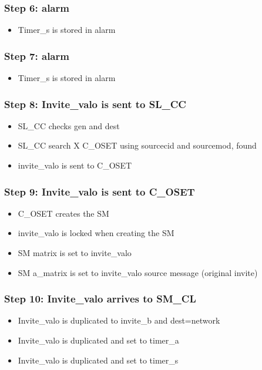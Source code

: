 \documentclass[a4paper]{report}
\begin{document}
\subsubsection{Step 6: alarm} 
\begin{itemize}
   \item Timer\_s is stored in alarm
\end{itemize}

\subsubsection{Step 7: alarm} 
\begin{itemize}
   \item Timer\_s is stored in alarm
\end{itemize}

\subsubsection{Step 8: Invite\_valo is sent to SL\_CC} 
\begin{itemize}
   \item SL\_CC checks gen and dest
   \item SL\_CC search X C\_OSET using sourcecid and sourcemod, found
   \item invite\_valo is sent to C\_OSET
\end{itemize}

\subsubsection{Step 9: Invite\_valo is sent to C\_OSET} 
\begin{itemize}
   \item C\_OSET creates the SM
   \item invite\_valo is locked when creating the SM
   \item SM matrix is set to invite\_valo
   \item SM a\_matrix is set to invite\_valo source message (original invite)
\end{itemize}

\subsubsection{Step 10: Invite\_valo arrives to SM\_CL} 
\begin{itemize}
   \item Invite\_valo is duplicated to invite\_b and dest=network
   \item Invite\_valo is duplicated and set to timer\_a
   \item Invite\_valo is duplicated and set to timer\_s
\end{itemize}
\end{document}
